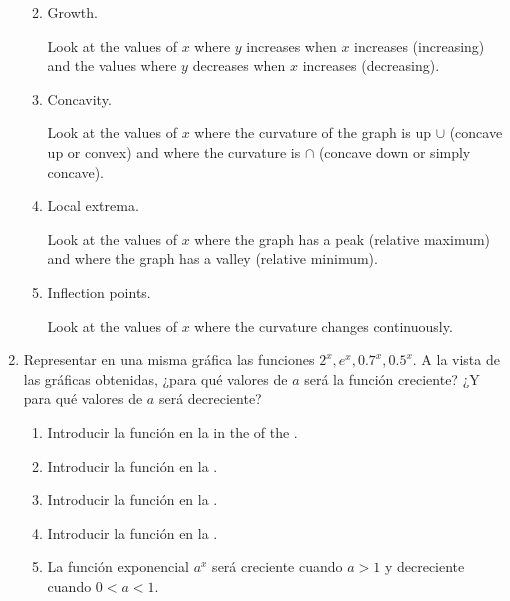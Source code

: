 \begin{enumerate}[leftmargin=*]
\begin{enumerate}
\begin{indication}
            \end{indication}

      \item Growth.
            \begin{indication}
            Look at the values of $x$ where $y$ increases when $x$ increases (increasing) and the values where $y$ decreases when $x$ increases (decreasing).
            \end{indication}

      \item Concavity.
            \begin{indication}
            Look at the values of $x$ where the curvature of the graph is up $\cup$ (concave up or convex) and where the curvature is $\cap$ (concave down or simply concave).
            \end{indication}

      \item Local extrema.
            \begin{indication}
            Look at the values of $x$ where the graph has a peak (relative maximum) and where the graph has a valley (relative minimum).
            \end{indication}

      \item Inflection points.
            \begin{indication}
            Look at the values of $x$ where the curvature changes continuously.
            \end{indication}
      \end{enumerate}

\item Representar en una misma gráfica las funciones $2^{x}, e^{x}, 0.7^{x}, 0.5^{x}$.
      A la vista de las gráficas obtenidas, ¿para qué valores de $a$ será la función creciente? ¿Y para qué valores de $a$ será decreciente?
      \begin{indication}
      \begin{enumerate}
      \item Introducir la función  en la in the  of the .
      \item Introducir la función  en la .
      \item Introducir la función  en la .
      \item Introducir la función  en la .
      \item La función exponencial $a^x$ será creciente cuando $a>1$ y decreciente cuando $0<a<1$.
      \end{enumerate}
      \end{indication}


\end{enumerate}
